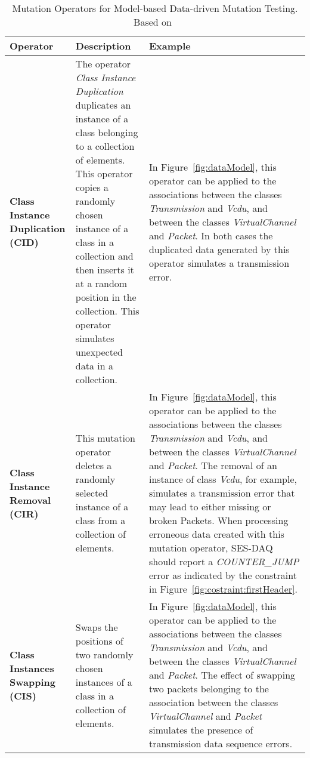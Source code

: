 
%


\begin{table}[h]
\caption{Mutation Operators for Model-based Data-driven Mutation Testing. Based on~\cite{di2015generating}}
\label{table:dataModelMutationOperators}


\tiny
\begin{tabular}{|p{2.5cm}|p{5cm}|p{7cm}|}

\hline
\textbf{Operator}&\textbf{Description}&\textbf{Example}\\
\hline
\textbf{Class Instance Duplication (CID)}&
The operator \emph{Class Instance Duplication} duplicates an instance of a class belonging to a collection of elements. This operator copies a randomly chosen instance of a class in a collection and then inserts it at a random position in the collection. This operator simulates unexpected data in a collection.
&In Figure~\ref{fig:dataModel}, this operator can be applied to the associations between the classes \emph{Transmission} and \emph{Vcdu}, and between the classes \emph{VirtualChannel} and \emph{Packet}. In both cases the duplicated data generated by this operator simulates a transmission error.\\
\hline
\textbf{Class Instance Removal (CIR)}
&This mutation operator deletes a randomly selected instance of a class from a collection of elements. 
&In Figure~\ref{fig:dataModel}, this operator can be applied to the associations between the classes \emph{Transmission} and \emph{Vcdu}, and between the classes \emph{VirtualChannel} and \emph{Packet}. The removal of an instance of class \emph{Vcdu}, for example, simulates a transmission error that may lead to either missing or broken Packets. When processing erroneous data created with this mutation operator, SES-DAQ should report a \emph{COUNTER\_JUMP} error as indicated by the constraint in Figure~\ref{fig:costraint:firstHeader}. \\
\hline
\textbf{Class Instances Swapping (CIS)}
&Swaps the positions of two randomly chosen instances of a class in a collection of elements. 
&In Figure~\ref{fig:dataModel}, this operator can be applied to the associations between the classes \emph{Transmission} and \emph{Vcdu}, and between the classes \emph{VirtualChannel} and \emph{Packet}. The effect of swapping two packets belonging to the association between the classes \emph{VirtualChannel} and \emph{Packet} simulates the presence of transmission data sequence errors.\\
\hline


\end{tabular}
\end{table}
